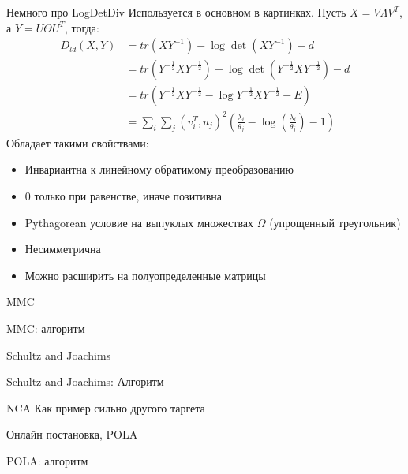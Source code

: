 \documentclass[14pt, fleqn, xcolor={dvipsnames, table}]{beamer}
\begin{document}
\begin{frame}{Немного про LogDetDiv}
\footnotesize
Используется в основном в картинках. Пусть $X = V \Lambda V^T$, а $Y = U \Theta U^T$, тогда:
$$\begin{array}{rl}
D_{ld}(X,Y) &= tr(XY^{-1}) - \log \det(XY^{-1}) - d \\
&= tr(Y^{-\frac{1}{2}}XY^{-\frac{1}{2}})  - \log \det (Y^{-\frac{1}{2}}XY^{-\frac{1}{2}}) - d \\
&= tr(Y^{-\frac{1}{2}}XY^{-\frac{1}{2}} - \log Y^{-\frac{1}{2}}XY^{-\frac{1}{2}} - E) \\
&= \sum_i\sum_j(v^T_i, u_j)^2\left(\frac{\lambda_i}{\theta_j} - \log(\frac{\lambda_i}{\theta_j}) - 1\right)
\end{array}$$
Обладает такими свойствами:
\begin{itemize}
\item Инвариантна к линейному обратимому преобразованию
\item 0 только при равенстве, иначе позитивна
\item Pythagorean условие на выпуклых множествах $\Omega$ (упрощенный треугольник)
\item Несимметрична
\item Можно расширить на полуопределенные матрицы
\end{itemize}
\end{frame}

\begin{frame}{MMC}
\end{frame}


\begin{frame}{MMC: алгоритм}
\end{frame}


\begin{frame}{Schultz and Joachims}
\end{frame}

\begin{frame}{Schultz and Joachims: Алгоритм}
\end{frame}

\begin{frame}{NCA}
Как пример сильно другого таргета
\end{frame}

\begin{frame}{Онлайн постановка, POLA}
\end{frame}

\begin{frame}{POLA: алгоритм}
\end{frame}
\end{document}

